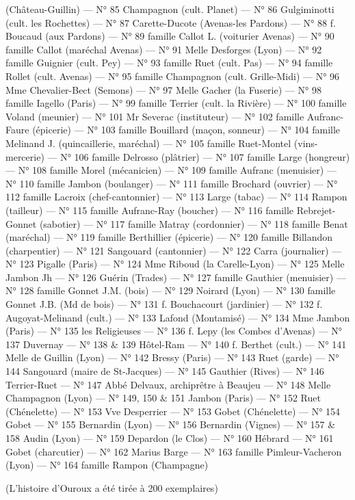 \documentclass[11pt,a4paper]{report}
\begin{document}
\begin{small}
(Château-Guillin) — N° 85 Champagnon (cult. Planet) — N° 86 Gulgiminotti (cult. les Rochettes) — N° 87 Carette-Ducote (Avenas-les Pardons) — N° 88 f. Boucaud (aux Pardons) — N° 89 famille Callot L. (voiturier Avenas) — N° 90 famille Callot (maréchal Avenas) — N° 91 Melle Desforges (Lyon) — N° 92 famille Guignier (cult. Pey) — N° 93 famille Ruet (cult. Pas) — N° 94 famille Rollet (cult. Avenas) — N° 95 famille Champagnon (cult. Grille-Midi) — N° 96 Mme Chevalier-Bect (Semons) — N° 97 Melle Gacher (la Fuserie) — N° 98 famille Iagello (Paris) — N° 99 famille Terrier (cult. la Rivière) — N° 100 famille Voland (meunier) — N° 101 Mr Severac (instituteur) — N° 102 famille Aufranc-Faure (épicerie) — N° 103 famille Bouillard (maçon, sonneur) — N° 104 famille Melinand J. (quincaillerie, maréchal) — N° 105 famille Ruet-Montel (vins-mercerie) — N° 106 famille Delrosso (plâtrier) — N° 107 famille Large (hongreur) — N° 108 famille Morel (mécanicien) — N° 109 famille Aufranc (menuisier) — N° 110 famille Jambon (boulanger) — N° 111 famille Brochard (ouvrier) — N° 112 famille Lacroix (chef-cantonnier) — N° 113 Large (tabac) — N° 114 Rampon (tailleur) — N° 115 famille Aufranc-Ray (boucher) — N° 116 famille Rebrejet-Gonnet (sabotier) — N° 117 famille Matray (cordonnier) — N° 118 famille Benat (maréchal) — N° 119 famille Berthillier (épicerie) — N° 120 famille Billandon (charpentier) — N° 121 Sangouard (cantonnier) — N° 122 Carra (journalier) — N° 123 Pigalle (Paris) — N° 124 Mme Riboud (la Carelle-Lyon) — N° 125 Melle Jambon Jh — N° 126 Guérin (Trades) — N° 127 famille Gauthier (menuisier) — N° 128 famille Gonnet J.M. (bois) — N° 129 Noirard (Lyon) — N° 130 famille Gonnet J.B. (Md de bois) — N° 131 f. Bouchacourt (jardinier) — N° 132 f. Augoyat-Melinand (cult.) — N° 133 Lafond (Montamisé) — N° 134 Mme Jambon (Paris) — N° 135 les Religieuses — N° 136 f. Lepy (les Combes d'Avenas) — N° 137 Duvernay — N° 138 \& 139 Hôtel-Ram — N° 140 f. Berthet (cult.) — N° 141 Melle de Guillin (Lyon) — N° 142 Bressy (Paris) — N° 143 Ruet (garde) — N° 144 Sangouard (maire de St-Jacques) — N° 145 Gauthier (Rives) — N° 146 Terrier-Ruet — N° 147 Abbé Delvaux, archiprêtre à Beaujeu — N° 148 Melle Champagnon (Lyon) — N° 149, 150 \& 151 Jambon (Paris) — N° 152 Ruet (Chénelette) — N° 153 Vve Desperrier — N° 153 Gobet (Chénelette) — N° 154 Gobet — N° 155 Bernardin (Lyon) — N° 156 Bernardin (Vignes) — N° 157 \& 158 Audin (Lyon) — N° 159 Depardon (le Clos) — N° 160 Hébrard — N° 161 Gobet (charcutier) — N° 162 Marius Barge — N° 163 famille Pimleur-Vacheron (Lyon) — N° 164 famille Rampon (Champagne)

(L'histoire d'Ouroux a été tirée à 200 exemplaires)
\end{small}
\end{document}
